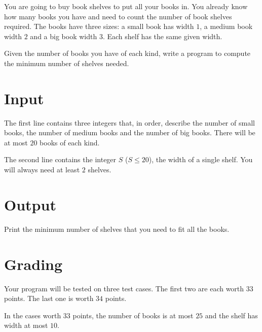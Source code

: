 You are going to buy book shelves to put all your books in.
You already know how many books you have and need to count the number of book shelves required.
The books have three sizes: a small book has width $1$, a medium book width $2$ and a big book width $3$.
Each shelf has the same given width.

Given the number of books you have of each kind, write a program to compute the minimum number of shelves needed.

\section*{Input}
The first line contains three integers that, in order, describe the number of small books, the number of medium books and the number of big books.
There will be at most $20$ books of each kind.

The second line contains the integer $S$ ($S \le 20$), the width of a single shelf.
You will always need at least $2$ shelves.

\section*{Output}
Print the minimum number of shelves that you need to fit all the books.

\section*{Grading}
Your program will be tested on three test cases.
The first two are each worth $33$ points.
The last one is worth $34$ points.

In the cases worth $33$ points, the number of books is at most $25$ and the shelf has width at most $10$.
